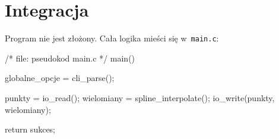 \documentclass[10pt,a4paper]{article}
\newcommand{\p}[1]{\texttt{#1}}
\begin{document}
\section{Integracja}

Program nie jest złożony. Cała logika mieści się w~\p{main.c}:
\begin{SmallVerbatim}
    /* file: pseudokod main.c */
    main()
    {
      globalne_opcje = cli_parse();

      punkty = io_read();
      wielomiany = spline_interpolate();
      io_write(punkty, wielomiany);
      
      return sukces;
    }
\end{SmallVerbatim}
\end{document}
